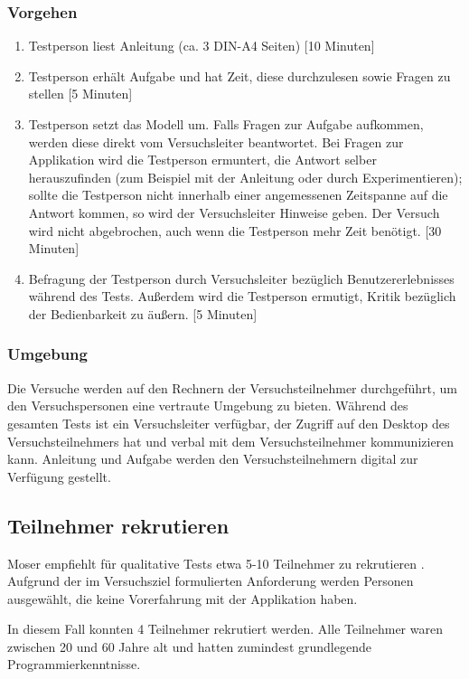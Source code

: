 \subsubsection*{Vorgehen}
\begin{enumerate}
    \item Testperson liest Anleitung (ca. 3 DIN-A4 Seiten) [10 Minuten]
    \item Testperson erhält Aufgabe und hat Zeit, diese durchzulesen sowie Fragen zu stellen [5 Minuten]
    \item Testperson setzt das Modell um. Falls Fragen zur Aufgabe aufkommen, werden diese direkt vom Versuchsleiter beantwortet. Bei Fragen zur Applikation wird die Testperson ermuntert, die Antwort selber herauszufinden (zum Beispiel mit der Anleitung oder durch Experimentieren); sollte die Testperson nicht innerhalb einer angemessenen Zeitspanne auf die Antwort kommen, so wird der Versuchsleiter Hinweise geben. Der Versuch wird nicht abgebrochen, auch wenn die Testperson mehr Zeit benötigt. [30 Minuten]
    \item Befragung der Testperson durch Versuchsleiter bezüglich Benutzererlebnisses während des Tests. Außerdem wird die Testperson ermutigt, Kritik bezüglich der Bedienbarkeit zu äußern. [5 Minuten]
\end{enumerate}

\subsubsection*{Umgebung}
Die Versuche werden auf den Rechnern der Versuchsteilnehmer durchgeführt, um den Versuchspersonen eine vertraute Umgebung zu bieten. Während des gesamten Tests ist ein Versuchsleiter verfügbar, der Zugriff auf den Desktop des Versuchsteilnehmers hat und verbal mit dem Versuchsteilnehmer kommunizieren kann. Anleitung und Aufgabe werden den Versuchsteilnehmern digital zur Verfügung gestellt.

\subsection{Teilnehmer rekrutieren}

Moser empfiehlt für qualitative Tests etwa 5-10 Teilnehmer zu rekrutieren \cite{Moser2012}. Aufgrund der im Versuchsziel formulierten Anforderung werden Personen ausgewählt, die keine Vorerfahrung mit der Applikation haben.

In diesem Fall konnten 4 Teilnehmer rekrutiert werden. Alle Teilnehmer waren zwischen 20 und 60 Jahre alt und hatten zumindest grundlegende Programmierkenntnisse.

